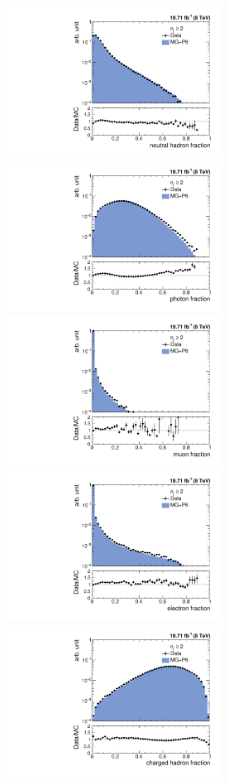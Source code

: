 \begin{figure}[!htbp]
  \begin{center}
    \includegraphics[width=0.5\textwidth]{Plots_HT_2_150/Comparison_NuHadFrac_2_HT_2_150.pdf}%
    ~~\includegraphics[width=0.5\textwidth]{Plots_HT_2_150/Comparison_PhFrac_2_HT_2_150.pdf}\\
    \includegraphics[width=0.5\textwidth]{Plots_HT_2_150/Comparison_MuFrac_2_HT_2_150.pdf}%
    ~~\includegraphics[width=0.5\textwidth]{Plots_HT_2_150/Comparison_ElFrac_2_HT_2_150.pdf}\\
    \includegraphics[width=0.5\textwidth]{Plots_HT_2_150/Comparison_ChHadFrac_2_HT_2_150.pdf}%

\end{center}
\end{figure}
